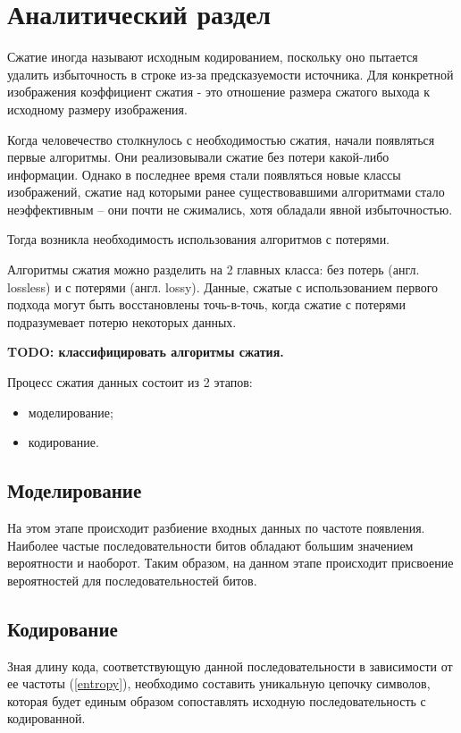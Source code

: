 \chapter{Аналитический раздел}

Сжатие иногда называют исходным кодированием, поскольку оно пытается удалить избыточность в строке из-за предсказуемости источника.
Для конкретной изображения коэффициент сжатия - это отношение размера сжатого выхода к исходному размеру изображения. \cite{text-compression}

Когда человечество столкнулось с необходимостью сжатия, начали появляться первые алгоритмы.
Они реализовывали сжатие без потери какой-либо информации.
Однако в последнее время стали появляться новые классы изображений, сжатие над которыми ранее существовавшими алгоритмами стало неэффективным -- они почти не сжимались, хотя обладали явной избыточностью. \cite{troubles-rating-while-compressing}

Тогда возникла необходимость использования алгоритмов с потерями.

Алгоритмы сжатия можно разделить на 2 главных класса: без потерь (англ. lossless) и с потерями (англ. lossy). 
Данные, сжатые с использованием первого подхода могут быть восстановлены точь-в-точь, когда сжатие с потерями подразумевает потерю некоторых данных. \cite{sayood2002lossless}

\textbf{TODO: классифицировать алгоритмы сжатия.}

Процесс сжатия данных состоит из 2 этапов:
\begin{itemize}
    \item моделирование;
    \item кодирование.
\end{itemize}

\section{Моделирование}

На этом этапе происходит разбиение входных данных по частоте появления. Наиболее частые последовательности битов обладают большим значением вероятности и наоборот.
Таким образом, на данном этапе происходит присвоение вероятностей для последовательностей битов. 

\section{Кодирование}

Зная длину кода, соответствующую данной последовательности в зависимости от ее частоты (\ref{entropy}), необходимо составить уникальную цепочку символов, которая будет единым образом сопоставлять исходную последовательность с кодированной.

